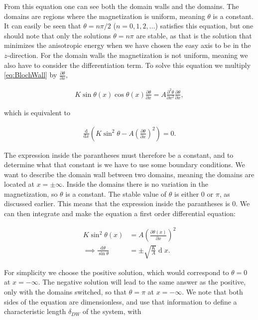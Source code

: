 \documentclass[1p]{elsarticle}		%
\renewcommand{\d}[1]{\ensuremath{\operatorname{d}\!{#1}}}
\numberwithin{equation}{section}
\begin{document}
From this equation one can see both the domain walls and the domains. The domains are regions where the magnetization is uniform, meaning $\theta$ is a constant. It can easily be seen that $\theta = n\pi/2$ ($n = 0, 1, 2, \ldots$) satisfies this equation, but one should note that only the solutions $\theta = n\pi$ are stable, as that is the solution that minimizes the anisotropic energy when we have chosen the easy axis to be in the $z$-direction. For the domain walls the magnetization is not uniform, meaning we also have to consider the differentiation term. To solve this equation we multiply \eqref{eq:BlochWall} by $\frac{\partial \theta}{\partial x}$,

\begin{align}
\label{eq:theta_doublediff}
K\sin \theta (x) \cos \theta (x) \frac{\partial \theta}{\partial x} = A \frac{\partial^2 \theta}{\partial x^2}\frac{\partial \theta}{\partial x},
\end{align}

which is equivalent to

\begin{align}
\frac{\textrm{d}}{\textrm{d} x} (K \sin ^2 \theta - A (\frac{\partial \theta}{\partial x})^2) = 0.
\end{align}

The expression inside the parantheses must therefore be a constant, and to determine what that constant is we have to use some boundary conditions. We want to describe the domain wall between two domains, meaning the domains are located at $x = \pm \infty$. Inside the domains there is no variation in the magnetization, so $\theta$ is a constant. The stable value of $\theta$ is either 0 or $\pi$, as discussed earlier. This means that the expression inside the parantheses is 0. We can then integrate and make the equation a first order differential equation:

\begin{align*}
K \sin ^2 \theta(x) &= A (\frac{\partial \theta(x)}{\partial x})^2 \\
\implies \frac{\textrm{d} \theta}{\sin \theta} &= \pm \sqrt{\frac{K}{A}} \d x.
\end{align*}

For simplicity we choose the positive solution, which would correspond to $\theta = 0$ at $x = -\infty$. The negative solution will lead to the same answer as the positive, only with the domains switched, so that $\theta = \pi$ at $x = -\infty$. We note that both sides of the equation are dimensionless, and use that information to define a characteristic length $\delta_{DW}$ of the system, with
\end{document}
